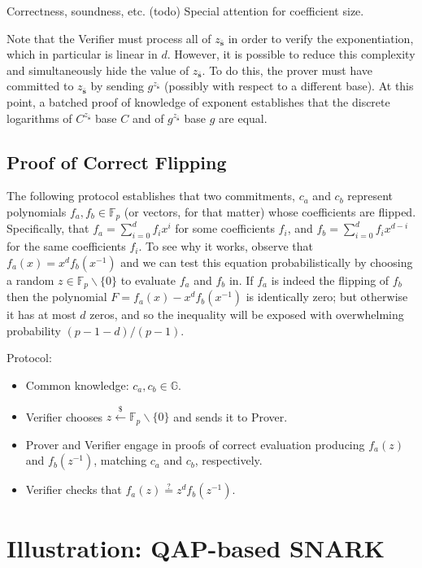 \documentclass{article}
\begin{document}
Correctness, soundness, etc. (todo) Special attention for coefficient size.

Note that the Verifier must process all of $z_{\bar{\mathbf{s}}}$ in order to verify the exponentiation, which in particular is linear in $d$. However, it is possible to reduce this complexity and simultaneously hide the value of $z_{\bar{\mathbf{s}}}$. To do this, the prover must have committed to $z_{\bar{\mathbf{s}}}$ by sending $g^{z_{\bar{\mathbf{s}}}}$ (possibly with respect to a different base). At this point, a batched proof of knowledge of exponent establishes that the discrete logarithms of $C^{z_{\bar{\mathbf{s}}}}$ base $C$ and of $g^{z_{\bar{\mathbf{s}}}}$ base $g$ are equal.

\subsection{Proof of Correct Flipping}

The following protocol establishes that two commitments, $c_a$ and $c_b$ represent polynomials $f_a, f_b \in \mathbb{F}_p$ (or vectors, for that matter) whose coefficients are flipped. Specifically, that $f_a = \sum_{i=0}^{d}f_i x^i$ for some coefficients $f_i$, and $f_b = \sum_{i=0}^df_ix^{d-i}$ for the same coefficients $f_i$. To see why it works, observe that $f_a(x) = x^df_b(x^{-1})$ and we can test this equation probabilistically by choosing a random $z \in \mathbb{F}_p \backslash \{0\}$ to evaluate $f_a$ and $f_b$ in. If $f_a$ is indeed the flipping of $f_b$ then the polynomial $F = f_a(x) - x^df_b(x^{-1})$ is identically zero; but otherwise it has at most $d$ zeros, and so the inequality will be exposed with overwhelming probability $(p-1-d)/(p-1)$.

Protocol:
\begin{itemize}
    \item Common knowledge: $c_a, c_b \in \mathbb{G}$.
    \item Verifier chooses $z \xleftarrow{\$} \mathbb{F}_p \backslash \{0\}$ and sends it to Prover.
    \item Prover and Verifier engage in proofs of correct evaluation producing $f_a(z)$ and $f_b(z^{-1})$, matching $c_a$ and $c_b$, respectively.
    \item Verifier checks that $f_a(z) \stackrel{?}{=} z^d f_b(z^{-1})$.
\end{itemize}

\section{Illustration: QAP-based SNARK}
\end{document}
